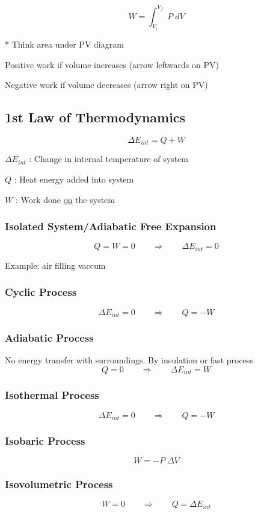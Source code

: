 \documentclass[12pt, twocolumn]{article}
\begin{document}
\begin{spacing}{1.5}
$$W = \int_{V_i}^{V_f} \; P \; dV$$

* Think area under PV diagram

\begin{itemize*}
	\item Positive work if volume increases (arrow leftwards on PV)
	\item Negative work if volume decreases (arrow right on PV)
\end{itemize*}

\subsection{1st Law of Thermodynamics}

$$\Delta E_{int} = Q + W$$

\begin{itemize*}
	\item $\Delta E_{int}$ : Change in internal temperature of system
	\item $Q$ : Heat energy added into system
	\item $W$ : Work done \underline{on} the system
\end{itemize*}

\subsubsection{Isolated System/Adiabatic Free Expansion}

$$Q = W = 0 \qquad \Rightarrow \qquad \Delta E_{int} = 0$$

Example: air filling vaccum

\subsubsection{Cyclic Process}

$$\Delta E_{int} = 0 \qquad \Rightarrow \qquad Q = -W$$

\subsubsection{Adiabatic Process}

No energy transfer with surroundings. By insulation or fast process
$$Q = 0 \qquad \Rightarrow \qquad \Delta E_{int} = W$$

\subsubsection{Isothermal Process}

$$\Delta E_{int} = 0 \qquad \Rightarrow \qquad Q = -W$$

\subsubsection{Isobaric Process}

$$W = -P \; \Delta V$$

\subsubsection{Isovolumetric Process}

$$W = 0 \qquad \Rightarrow \qquad Q = \Delta E_{int}$$

\end{spacing}
\end{document}
